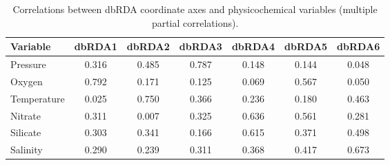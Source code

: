 \begin{table}[!ht]
\caption[Correlations between dbRDA axes and physicochemical variables]{Correlations between dbRDA coordinate axes and physicochemical variables (multiple partial correlations).}
\label{tab:dbRDAcorrs}
\begin{center}
\begin{tabular}{lS[table-format=3.2]S[table-format=3.2]S[table-format=3.2]S[table-format=3.2]S[table-format=3.2]S[table-format=3.2]}%
\toprule
\textbf{Variable} & \textbf{dbRDA1} & \textbf{dbRDA2} & \textbf{dbRDA3} & \textbf{dbRDA4} & \textbf{dbRDA5} & \textbf{dbRDA6}\\
\midrule
Pressure & \textminus{}0.316 & \textminus{}0.485 & \textminus{}0.787 & \textminus{}0.148 & \textminus{}0.144 & \textminus{}0.048\\
Oxygen & 0.792 & \textminus{}0.171 & \textminus{}0.125 & 0.069 & \textminus{}0.567 & 0.050\\
Temperature & \textminus{}0.025 & \textminus{}0.750 & 0.366 & 0.236 & 0.180 & 0.463\\
Nitrate & \textminus{}0.311 & 0.007 & 0.325 & \textminus{}0.636 & \textminus{}0.561 & 0.281\\
Silicate & \textminus{}0.303 & 0.341 & \textminus{}0.166 & 0.615 & \textminus{}0.371 & 0.498\\
Salinity & \textminus{}0.290 & \textminus{}0.239 & 0.311 & 0.368 & \textminus{}0.417 & \textminus{}0.673\\
\bottomrule
\end{tabular}
\end{center}
\end{table}
